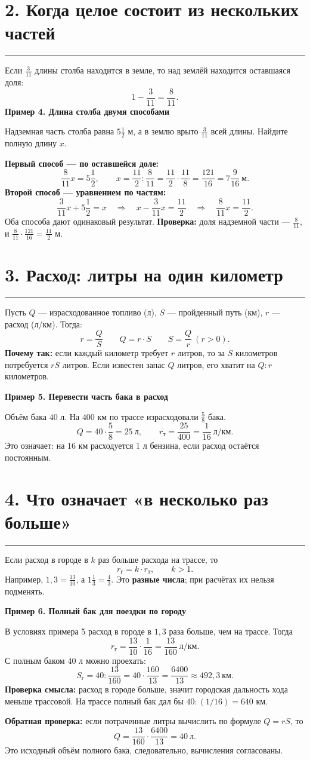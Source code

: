 \documentclass[a4paper,12pt]{article}
\newcommand{\sect}[1]{\section*{#1}\vspace{-3pt}\noindent\textcolor{accent}{\rule{\linewidth}{0.5pt}}\vspace{3pt}}
\newcommand{\key}[1]{\textcolor{darkaccent}{\textbf{#1}}}
\newcommand{\ex}[1]{\medskip\noindent\textcolor{darkaccent}{\textbf{#1}}\par\vspace{-1mm}}
\begin{document}
\sect{2. Когда целое состоит из нескольких частей}
Если $\frac3{11}$ длины столба находится в земле, то над землёй находится оставшаяся доля:
\[
1-\frac3{11}=\frac8{11}.
\]
\ex{Пример 4. Длина столба двумя способами}
Надземная часть столба равна $5\frac12$ м, а в землю врыто $\frac3{11}$ всей длины. Найдите полную длину $x$.

\key{Первый способ --- по оставшейся доле:}
\[
\frac8{11}x=5\frac12,\qquad
x=\frac{11}{2}:\frac8{11}
=\frac{11}{2}\cdot\frac{11}{8}
=\frac{121}{16}=7\frac9{16}\ \text{м}.
\]
\key{Второй способ --- уравнением по частям:}
\[
\frac3{11}x+5\frac12=x
\quad\Longrightarrow\quad
x-\frac3{11}x=\frac{11}{2}
\quad\Longrightarrow\quad
\frac8{11}x=\frac{11}{2}.
\]
Оба способа дают одинаковый результат. \key{Проверка:} доля надземной части --- $\frac8{11}$, и $\frac8{11}\cdot\frac{121}{16}=\frac{11}{2}$ м.

\sect{3. Расход: литры на один километр}
Пусть $Q$ --- израсходованное топливо (л), $S$ --- пройденный путь (км), $r$ --- расход (л/км). Тогда:
\[
r=\frac QS\qquad
Q=r\cdot S\qquad
S=\frac Qr\ (r>0).
\]
\key{Почему так:} если каждый километр требует $r$ литров, то за $S$ километров потребуется $rS$ литров. Если известен запас $Q$ литров, его хватит на $Q:r$ километров.

\ex{Пример 5. Перевести часть бака в расход}
Объём бака $40$ л. На $400$ км по трассе израсходовали $\frac58$ бака.
\[
Q=40\cdot\frac58=25\ \text{л},\qquad
r_{\text{т}}=\frac{25}{400}=\frac1{16}\ \text{л/км}.
\]
Это означает: на $16$ км расходуется $1$ л бензина, если расход остаётся постоянным.

\sect{4. Что означает «в несколько раз больше»}
Если расход в городе в $k$ раз больше расхода на трассе, то
\[
r_{\text{г}}=k\cdot r_{\text{т}},\qquad k>1.
\]
Например, $1{,}3=\frac{13}{10}$, а $1\frac13=\frac43$. Это \key{разные числа}; при расчётах их нельзя подменять.

\ex{Пример 6. Полный бак для поездки по городу}
В условиях примера 5 расход в городе в $1{,}3$ раза больше, чем на трассе. Тогда
\[
r_{\text{г}}=\frac{13}{10}\cdot\frac1{16}
=\frac{13}{160}\ \text{л/км}.
\]
С полным баком $40$ л можно проехать:
\[
S_{\text{г}}=40:\frac{13}{160}
=40\cdot\frac{160}{13}=\frac{6400}{13}
\approx492{,}3\ \text{км}.
\]
\key{Проверка смысла:} расход в городе больше, значит городская дальность хода меньше трассовой. На трассе полный бак дал бы $40:(1/16)=640$ км.

\key{Обратная проверка:} если потраченные литры вычислить по формуле $Q=rS$, то
\[
Q=\frac{13}{160}\cdot\frac{6400}{13}=40\ \text{л}.
\]
Это исходный объём полного бака, следовательно, вычисления согласованы.
\end{document}
